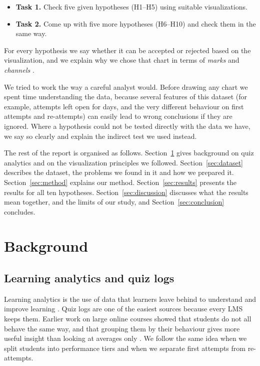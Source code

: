 \documentclass[11pt,a4paper]{article}
\begin{document}
\begin{itemize}
  \item \textbf{Task 1.} Check five given hypotheses (H1--H5) using suitable
        visualizations.
  \item \textbf{Task 2.} Come up with five more hypotheses (H6--H10) and check
        them in the same way.
\end{itemize}

For every hypothesis we say whether it can be accepted or rejected based on
the visualization, and we explain why we chose that chart in terms of
\emph{marks} and \emph{channels} \citep{munzner2014visualization}.

We tried to work the way a careful analyst would. Before drawing any chart we
spent time understanding the data, because several features of this dataset
(for example, attempts left open for days, and the very different behaviour on
first attempts and re-attempts) can easily lead to wrong conclusions if they
are ignored. Where a hypothesis could not be tested directly with the data we
have, we say so clearly and explain the indirect test we used instead.

The rest of the report is organised as follows. Section~\ref{sec:background}
gives background on quiz analytics and on the visualization principles we
followed. Section~\ref{sec:dataset} describes the dataset, the problems we
found in it and how we prepared it. Section~\ref{sec:method} explains our
method. Section~\ref{sec:results} presents the results for all ten hypotheses.
Section~\ref{sec:discussion} discusses what the results mean together, and
the limits of our study, and Section~\ref{sec:conclusion} concludes.

\section{Background}
\label{sec:background}

\subsection{Learning analytics and quiz logs}

Learning analytics is the use of data that learners leave behind to understand
and improve learning \citep{siemens2011penetrating}. Quiz logs are one of the
easiest sources because every LMS keeps them. Earlier work on large online
courses showed that students do not all behave the same way, and that grouping
them by their behaviour gives more useful insight than looking at averages
only \citep{kizilcec2013deconstructing}. We follow the same idea when we split
students into performance tiers and when we separate first attempts from
re-attempts.
\end{document}

